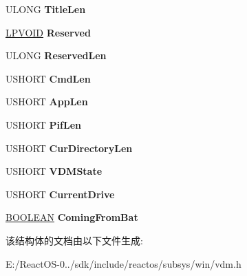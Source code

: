 \begin{DoxyCompactItemize}
\mbox{\label{struct_v_d_m___c_o_m_m_a_n_d___i_n_f_o_a8cab54f4a3c7e4b835505c1e19068f3c}} 
U\+L\+O\+NG {\bfseries Title\+Len}
\item 
\mbox{\label{struct_v_d_m___c_o_m_m_a_n_d___i_n_f_o_ac620a753b3dd6c98af009d0b8b0b00dd}} 
\hyperlink{interfacevoid}{L\+P\+V\+O\+ID} {\bfseries Reserved}
\item 
\mbox{\label{struct_v_d_m___c_o_m_m_a_n_d___i_n_f_o_a5356aca38ec08ff6c6f2f6f7905ae460}} 
U\+L\+O\+NG {\bfseries Reserved\+Len}
\item 
\mbox{\label{struct_v_d_m___c_o_m_m_a_n_d___i_n_f_o_a752ade5e712125e0ff7f30a343cadf7c}} 
U\+S\+H\+O\+RT {\bfseries Cmd\+Len}
\item 
\mbox{\label{struct_v_d_m___c_o_m_m_a_n_d___i_n_f_o_a512894eb5b2de814d6f013ad2c1b4703}} 
U\+S\+H\+O\+RT {\bfseries App\+Len}
\item 
\mbox{\label{struct_v_d_m___c_o_m_m_a_n_d___i_n_f_o_a7f488dfc01434b597140ba0c1b7a1de8}} 
U\+S\+H\+O\+RT {\bfseries Pif\+Len}
\item 
\mbox{\label{struct_v_d_m___c_o_m_m_a_n_d___i_n_f_o_a94b29f3df74ba72043cfee05826cb477}} 
U\+S\+H\+O\+RT {\bfseries Cur\+Directory\+Len}
\item 
\mbox{\label{struct_v_d_m___c_o_m_m_a_n_d___i_n_f_o_adc0849f1bb09a4ecff99882f93c3a37b}} 
U\+S\+H\+O\+RT {\bfseries V\+D\+M\+State}
\item 
\mbox{\label{struct_v_d_m___c_o_m_m_a_n_d___i_n_f_o_ab04fcd5bbefa8b093806132a1b9176f5}} 
U\+S\+H\+O\+RT {\bfseries Current\+Drive}
\item 
\mbox{\label{struct_v_d_m___c_o_m_m_a_n_d___i_n_f_o_a35a88fb903f6741d18ad98c9f457b954}} 
\hyperlink{_processor_bind_8h_a112e3146cb38b6ee95e64d85842e380a}{B\+O\+O\+L\+E\+AN} {\bfseries Coming\+From\+Bat}
\end{DoxyCompactItemize}


该结构体的文档由以下文件生成\+:\begin{DoxyCompactItemize}
\item 
E\+:/\+React\+O\+S-\/0../sdk/include/reactos/subsys/win/vdm.\+h\end{DoxyCompactItemize}
